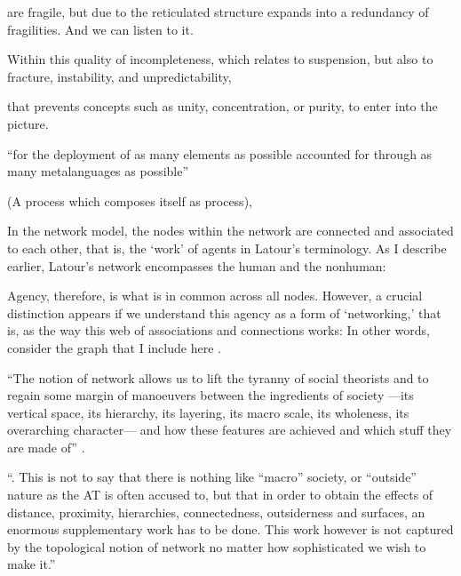are fragile, but due to the reticulated structure expands into a redundancy of fragilities. And we can listen to it.








Within this quality of incompleteness, which relates to suspension, but also to fracture, instability, and unpredictability, 

that prevents concepts such as unity, concentration, or purity, to enter into the picture. 



``for the deployment of as many elements as possible accounted for through as many metalanguages as possible''

(A process which composes itself as process), 


In the network model, the nodes within the network are connected and associated to each other, that is, the `work' of agents in Latour's terminology. As I describe earlier, Latour's network encompasses the human and the nonhuman: 

Agency, therefore, is what is in common across all nodes. However, a crucial distinction appears if we understand this agency as a form of `networking,' that is, as the way this web of associations and connections works: 
In other words, consider the graph that I include here . 

``The notion of network allows us to lift the tyranny of social theorists and to regain some margin of manoeuvers between the ingredients of society ---its vertical space, its hierarchy, its layering, its macro scale, its wholeness, its overarching character--- and how these features are achieved and which stuff they are made of'' \parencite[5]{Lat90:On}.


``. This is not to say that there is nothing like “macro” society, or “outside” nature as the AT is often accused to, but that in order to obtain the effects of distance, proximity, hierarchies, connectedness, outsiderness and surfaces, an enormous supplementary work has to be done. This work however is not captured by the topological notion of network no matter how sophisticated we wish to make it.'' \parencite[6]{Lat90:On}




% 
% 
% 
% 
% 
% 



